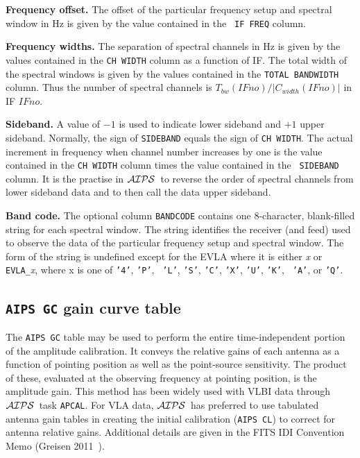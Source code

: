 \documentclass[twoside]{article}
\newcommand{\Me}[1]{\textcolor{mecol}{#1}}
\newcommand{\AIPS}{{$\cal AIPS\/$}}
\begin{document}
{\bf Frequency offset.} The offset of the particular frequency setup
and spectral window in Hz is given by the value contained in the {\tt
  IF FREQ} column.

{\bf Frequency widths.} The separation of spectral channels in Hz is
given by the values contained in the {\tt CH WIDTH} column as a
function of IF\@.  The total width of the spectral windows is given by
the values contained in the {\tt   TOTAL BANDWIDTH} column.  Thus the
number of spectral channels is $T_{bw} (IFno) / | C_{width} (IFno) |$
in IF $IFno$.

{\bf Sideband.} A value of $-1$ is used to indicate lower sideband
and $+1$ upper sideband.  Normally, the sign of {\tt SIDEBAND}
equals the sign of {\tt CH WIDTH}\@.  The actual increment in
frequency when channel number increases by one is the value contained
in the {\tt CH WIDTH} column times the value contained in the {\tt
  SIDEBAND} column.  It is the practise in \AIPS\ to reverse the order
of spectral channels from lower sideband data and to then call the
data upper sideband.

\Me{{\bf Band code.} The optional column {\tt BANDCODE} contains one
8-character, blank-filled string for each spectral window.  The string
identifies the receiver (and feed) used to observe the data of the
particular frequency setup and spectral window.  The form of the
string is undefined except for the EVLA where it is either {\it x} or
{\tt EVLA\_}{\it x}, where x is one of {\tt '4'}, {\tt 'P'}, {\tt
  'L'}, {\tt 'S'}, {\tt 'C'}, {\tt 'X'}, {\tt 'U'}, {\tt 'K'}, {\tt
  'A'}, or {\tt 'Q'}\@.\label{rev:FQ}}

\vfill\eject
\subsection{{\tt AIPS GC} gain curve table}
\label{s:GC}

The {\tt AIPS GC} table may be used to perform the entire
time-independent portion of the amplitude calibration.  It conveys the
relative gains of each antenna as a function of pointing position as
well as the point-source sensitivity.  The product of these, evaluated
at the observing frequency at pointing position, is the amplitude
gain.  This method has been widely used with VLBI data through \AIPS\
task {\tt APCAL}\@.  For VLA data, \AIPS\ has preferred to use
tabulated antenna gain tables in creating the initial calibration
({\tt AIPS CL}) to correct for antenna relative gains.  Additional
details are given in the FITS IDI Convention Memo (Greisen
2011~\cite{G11}).
\end{document}
